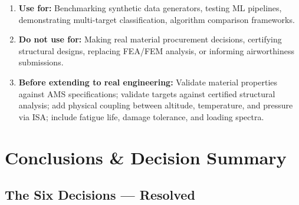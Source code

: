 \documentclass[11pt, a4paper]{report}
\begin{document}
\begin{enumerate}[leftmargin=*, itemsep=5pt]
\item \textbf{Use for:} Benchmarking synthetic data generators, testing ML pipelines, demonstrating multi-target classification, algorithm comparison frameworks.

\item \textbf{Do not use for:} Making real material procurement decisions, certifying structural designs, replacing FEA/FEM analysis, or informing airworthiness submissions.

\item \textbf{Before extending to real engineering:} Validate material properties against AMS specifications; validate targets against certified structural analysis; add physical coupling between altitude, temperature, and pressure via ISA; include fatigue life, damage tolerance, and loading spectra.
\end{enumerate}


\chapter{Conclusions \& Decision Summary}

\section{The Six Decisions — Resolved}
\end{document}
